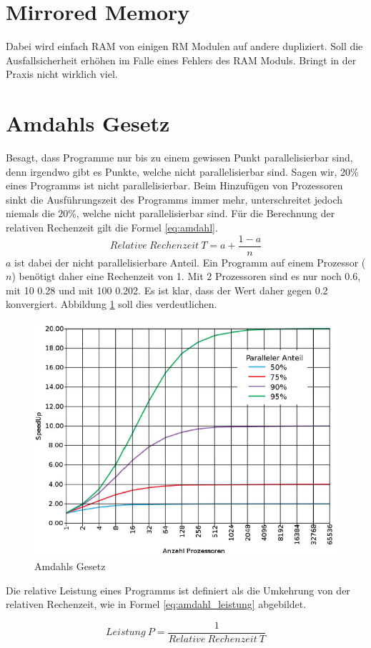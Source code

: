 \section{Mirrored Memory}
Dabei wird einfach RAM von einigen RM Modulen auf andere dupliziert. Soll die Ausfallsicherheit erhöhen im Falle eines Fehlers des RAM Moduls. Bringt in der Praxis nicht wirklich viel.

\section{Amdahls Gesetz}
Besagt, dass Programme nur bis zu einem gewissen Punkt parallelisierbar sind, denn irgendwo gibt es Punkte, welche nicht parallelisierbar sind. Sagen wir, 20\% eines Programms ist nicht parallelisierbar. Beim Hinzufügen von Prozessoren sinkt die Ausführungszeit des Programms immer mehr, unterschreitet jedoch niemals die 20\%, welche nicht parallelisierbar sind. 
Für die Berechnung der relativen Rechenzeit gilt die Formel \ref{eq:amdahl}.
\begin{equation}\label{eq:amdahl}
Relative\ Rechenzeit\ T = a + \frac{1-a}{n}
\end{equation}
$ a $ ist dabei der nicht parallelisierbare Anteil. Ein Programm auf einem Prozessor ($ n $) benötigt daher eine Rechenzeit von 1. Mit 2 Prozessoren sind es nur noch 0.6, mit 10 0.28 und mit 100 0.202. Es ist klar, dass der Wert daher gegen 0.2 konvergiert.
Abbildung \ref{fig:amdahl} soll dies verdeutlichen.
\begin{figure}[h!]
\centering
\includegraphics[width=0.5\linewidth]{fig/amdahl}
\caption{Amdahls Gesetz}
\label{fig:amdahl}
\end{figure}
Die relative Leistung eines Programms ist definiert als die Umkehrung von der relativen Rechenzeit, wie in Formel \ref{eq:amdahl_leistung} abgebildet.

\begin{equation}\label{eq:amdahl_leistung}
	Leistung\ P = \frac{1}{Relative\ Rechenzeit\ T }
\end{equation}

